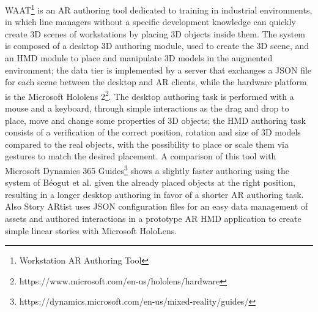 WAAT\footnote{Workstation AR Authoring Tool} \cite{de_paolis_waat_2020} is an AR authoring tool dedicated to training in industrial environments, in which line managers without a specific development knowledge can quickly create 3D scenes of workstations by placing 3D objects inside them. The system is composed of a desktop 3D authoring module, used to create the 3D scene, and an \gls{HMD} module to place and manipulate 3D models in the augmented environment; the data tier is implemented by a server that exchanges a JSON file for each scene between the desktop and AR clients, while the hardware platform is the Microsoft Hololens 2\footnote{https://www.microsoft.com/en-us/hololens/hardware}. The desktop authoring task is performed with a mouse and a keyboard, through simple interactions as the drag and drop to place, move and change some properties of 3D objects; the \gls{HMD} authoring task consists of a verification of the correct position, rotation and size of 3D models compared to the real objects, with the possibility to place or scale them via gestures to match the desired placement.
A comparison of this tool with Microsoft Dynamics 365 Guides\footnote{https://dynamics.microsoft.com/en-us/mixed-reality/guides/} shows a slightly faster authoring using the system of Béogut et al. given the already placed objects at the right position, resulting in a longer desktop authoring in favor of a shorter AR authoring task.\\
Also Story ARtist \cite{kegeleers_story_2021} uses JSON configuration files for an easy data management of assets and authored interactions in a prototype AR \gls{HMD} application to create simple linear stories with Microsoft HoloLens.